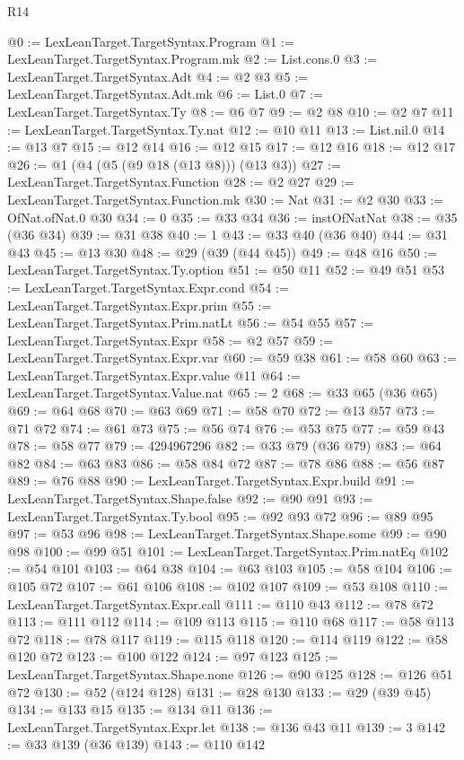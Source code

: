 \begin{lexlean}{R14}
\begin{coremodule}
@0 := LexLeanTarget.TargetSyntax.Program
@1 := LexLeanTarget.TargetSyntax.Program.mk
@2 := List.cons.{0}
@3 := LexLeanTarget.TargetSyntax.Adt
@4 := @2 @3
@5 := LexLeanTarget.TargetSyntax.Adt.mk
@6 := List.{0}
@7 := LexLeanTarget.TargetSyntax.Ty
@8 := @6 @7
@9 := @2 @8
@10 := @2 @7
@11 := LexLeanTarget.TargetSyntax.Ty.nat
@12 := @10 @11
@13 := List.nil.{0}
@14 := @13 @7
@15 := @12 @14
@16 := @12 @15
@17 := @12 @16
@18 := @12 @17
@26 := @1 (@4 (@5 (@9 @18 (@13 @8))) (@13 @3))
@27 := LexLeanTarget.TargetSyntax.Function
@28 := @2 @27
@29 := LexLeanTarget.TargetSyntax.Function.mk
@30 := Nat
@31 := @2 @30
@33 := OfNat.ofNat.{0} @30
@34 := 0
@35 := @33 @34
@36 := instOfNatNat
@38 := @35 (@36 @34)
@39 := @31 @38
@40 := 1
@43 := @33 @40 (@36 @40)
@44 := @31 @43
@45 := @13 @30
@48 := @29 (@39 (@44 @45))
@49 := @48 @16
@50 := LexLeanTarget.TargetSyntax.Ty.option
@51 := @50 @11
@52 := @49 @51
@53 := LexLeanTarget.TargetSyntax.Expr.cond
@54 := LexLeanTarget.TargetSyntax.Expr.prim
@55 := LexLeanTarget.TargetSyntax.Prim.natLt
@56 := @54 @55
@57 := LexLeanTarget.TargetSyntax.Expr
@58 := @2 @57
@59 := LexLeanTarget.TargetSyntax.Expr.var
@60 := @59 @38
@61 := @58 @60
@63 := LexLeanTarget.TargetSyntax.Expr.value @11
@64 := LexLeanTarget.TargetSyntax.Value.nat
@65 := 2
@68 := @33 @65 (@36 @65)
@69 := @64 @68
@70 := @63 @69
@71 := @58 @70
@72 := @13 @57
@73 := @71 @72
@74 := @61 @73
@75 := @56 @74
@76 := @53 @75
@77 := @59 @43
@78 := @58 @77
@79 := 4294967296
@82 := @33 @79 (@36 @79)
@83 := @64 @82
@84 := @63 @83
@86 := @58 @84 @72
@87 := @78 @86
@88 := @56 @87
@89 := @76 @88
@90 := LexLeanTarget.TargetSyntax.Expr.build
@91 := LexLeanTarget.TargetSyntax.Shape.false
@92 := @90 @91
@93 := LexLeanTarget.TargetSyntax.Ty.bool
@95 := @92 @93 @72
@96 := @89 @95
@97 := @53 @96
@98 := LexLeanTarget.TargetSyntax.Shape.some
@99 := @90 @98
@100 := @99 @51
@101 := LexLeanTarget.TargetSyntax.Prim.natEq
@102 := @54 @101
@103 := @64 @38
@104 := @63 @103
@105 := @58 @104
@106 := @105 @72
@107 := @61 @106
@108 := @102 @107
@109 := @53 @108
@110 := LexLeanTarget.TargetSyntax.Expr.call
@111 := @110 @43
@112 := @78 @72
@113 := @111 @112
@114 := @109 @113
@115 := @110 @68
@117 := @58 @113 @72
@118 := @78 @117
@119 := @115 @118
@120 := @114 @119
@122 := @58 @120 @72
@123 := @100 @122
@124 := @97 @123
@125 := LexLeanTarget.TargetSyntax.Shape.none
@126 := @90 @125
@128 := @126 @51 @72
@130 := @52 (@124 @128)
@131 := @28 @130
@133 := @29 (@39 @45)
@134 := @133 @15
@135 := @134 @11
@136 := LexLeanTarget.TargetSyntax.Expr.let
@138 := @136 @43 @11
@139 := 3
@142 := @33 @139 (@36 @139)
@143 := @110 @142

\end{coremodule}
\end{lexlean}
